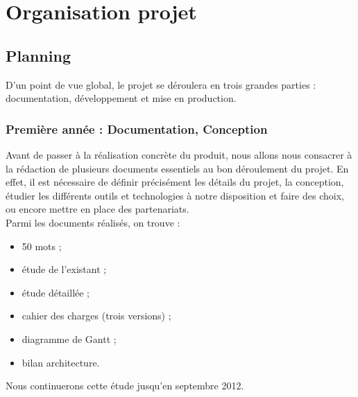 \documentclass{life-fr}
\begin{document}
\chapter{Organisation projet}

\section{Planning}

D'un point de vue global, le projet se déroulera en trois grandes parties : documentation, développement et mise en production.\\

\subsection{ Première année : Documentation, Conception}

Avant de passer à la réalisation concrète du produit, nous allons nous consacrer à la rédaction de plusieurs documents essentiels au bon déroulement du projet. En effet, il est nécessaire de définir précisément les détails du projet, la conception, étudier les différents outils et technologies à notre disposition et faire des choix, ou encore mettre en place des partenariats.\\
Parmi les documents réalisés, on trouve :

\begin{itemize}
  \item 50 mots ;
  \item étude de l'existant ;
  \item étude détaillée ;
  \item cahier des charges (trois versions) ;
  \item diagramme de Gantt ;
  \item bilan architecture.
\end{itemize}

Nous continuerons cette étude jusqu'en septembre 2012.\\

\newpage
\end{document}

